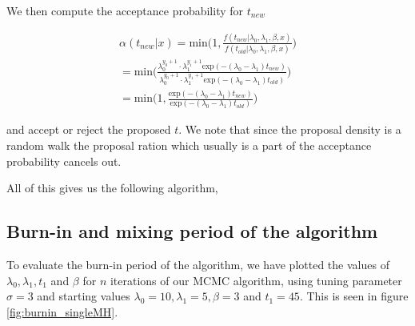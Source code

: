 
We then compute the acceptance probability for $t_{new}$

\begin{align}
    \alpha(t_{new}|x) = \text{min} \Big( 1, \frac{f(t_{new}| \lambda_0, \lambda_1, \beta, x)}{f(t_{old}| \lambda_0, \lambda_1, \beta, x)} \Big) \nonumber \\ 
    = \text{min} \Big( \frac{\lambda_0^{y_0 + 1} \cdot \lambda_1^{y_1 + 1} \text{exp}(-(\lambda_0 - \lambda_1)t_{new})}{\lambda_0^{y_0 + 1} \cdot \lambda_1^{y_1 + 1} \text{exp}(-(\lambda_0 - \lambda_1)t_{old})} \Big) \nonumber \\
    = \text{min} \Big( 1, \frac{\text{exp}(-(\lambda_0 - \lambda_1)t_{new})}{\text{exp}(-(\lambda_0 - \lambda_1)t_{old})} \Big)
\end{align}

and accept or reject the proposed $t$. We note that since the proposal density is a random walk the proposal ration which usually is a part of the acceptance probability cancels out. 

All of this gives us the following algorithm, 






\subsection{Burn-in and mixing period of the algorithm}

To evaluate the burn-in period of the algorithm, we have plotted the values of $\lambda_0, \lambda_1, t_1$ and $\beta$ for $n$ iterations of our MCMC algorithm, using tuning parameter $\sigma = 3$ and starting values $\lambda_0 = 10, \lambda_1 = 5, \beta = 3$ and $t_1 = 45$. This is seen in figure \ref{fig:burnin_singleMH}. 


